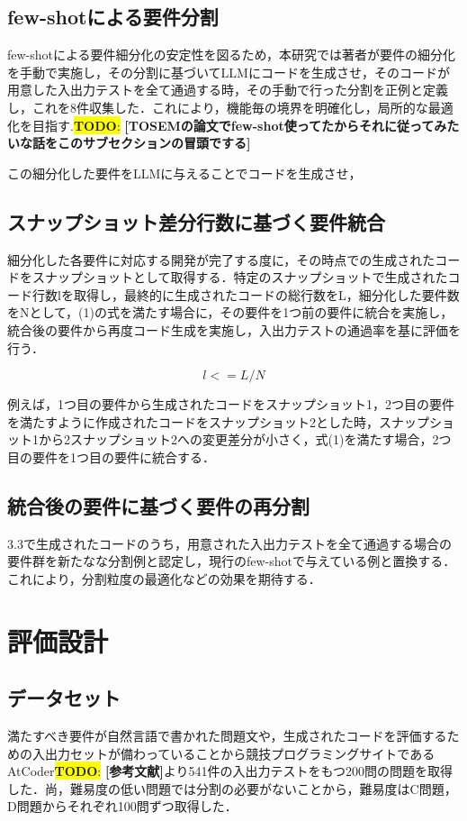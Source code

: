 \documentclass[submit,techrep,noauthor]{ipsj}
\newcommand{\todo}[1]{\colorbox{yellow}{{\bf TODO}:}{\color{red} {\textbf{[#1]}}}}
\begin{document}
\subsection{few-shotによる要件分割}
few-shotによる要件細分化の安定性を図るため，本研究では著者が要件の細分化を手動で実施し，その分割に基づいてLLMにコードを生成させ，そのコードが用意した入出力テストを全て通過する時，その手動で行った分割を正例と定義し，これを8件収集した．これにより，機能毎の境界を明確化し，局所的な最適化を目指す.\todo{TOSEMの論文でfew-shot使ってたからそれに従ってみたいな話をこのサブセクションの冒頭でする}

この細分化した要件をLLMに与えることでコードを生成させ，

\subsection{スナップショット差分行数に基づく要件統合}
細分化した各要件に対応する開発が完了する度に，その時点での生成されたコードをスナップショットとして取得する．特定のスナップショットで生成されたコード行数lを取得し，最終的に生成されたコードの総行数をL，細分化した要件数をNとして，(1)の式を満たす場合に，その要件を1つ前の要件に統合を実施し，統合後の要件から再度コード生成を実施し，入出力テストの通過率を基に評価を行う．

\begin{equation}
    l <= L / N
\end{equation}

例えば，1つ目の要件から生成されたコードをスナップショット1，2つ目の要件を満たすように作成されたコードをスナップショット2とした時，スナップショット1から2スナップショット2への変更差分が小さく，式(1)を満たす場合，2つ目の要件を1つ目の要件に統合する．

\subsection{統合後の要件に基づく要件の再分割}
3.3で生成されたコードのうち，用意された入出力テストを全て通過する場合の要件群を新たなな分割例と認定し，現行のfew-shotで与えている例と置換する．これにより，分割粒度の最適化などの効果を期待する．

\section{評価設計}
\subsection{データセット}
満たすべき要件が自然言語で書かれた問題文や，生成されたコードを評価するための入出力セットが備わっていることから競技プログラミングサイトであるAtCoder\todo{参考文献}より541件の入出力テストをもつ200問の問題を取得した．尚，難易度の低い問題では分割の必要がないことから，難易度はC問題，D問題からそれぞれ100問ずつ取得した．
\end{document}
